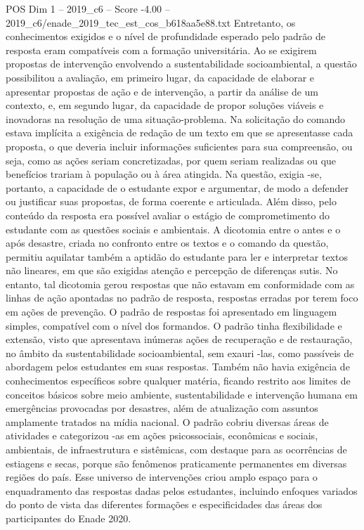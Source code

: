 \begin{textsample}{POS Dim 1 – 2019\_c6 – Score -4.00 – 2019\_c6/enade\_2019\_tec\_est\_cos\_b618aa5e88.txt}
Entretanto, os conhecimentos exigidos e o nível de profundidade esperado pelo padrão de resposta eram compatíveis com a formação universitária.
Ao se exigirem propostas de intervenção envolvendo a sustentabilidade socioambiental, a questão possibilitou a avaliação, em primeiro lugar, da capacidade de elaborar e apresentar propostas de ação e de intervenção, a partir da análise de um contexto, e, em segundo lugar, da capacidade de propor soluções viáveis e inovadoras na resolução de uma situação-problema.
Na solicitação do comando estava implícita a exigência de redação de um texto em que se apresentasse cada proposta, o que deveria incluir informações suficientes para sua compreensão, ou seja, como as ações seriam concretizadas, por quem seriam realizadas ou que benefícios trariam à população ou à área atingida.
Na questão, exigia -se, portanto, a capacidade de o estudante expor e argumentar, de modo a defender ou justificar suas propostas, de forma coerente e articulada.
Além disso, pelo conteúdo da resposta era possível avaliar o estágio de comprometimento do estudante com as questões sociais e ambientais.
A dicotomia entre o antes e o após desastre, criada no confronto entre os textos e o comando da questão, permitiu aquilatar também a aptidão do estudante para ler e interpretar textos não lineares, em que são exigidas atenção e percepção de diferenças sutis.
No entanto, tal dicotomia gerou respostas que não estavam em conformidade com as linhas de ação apontadas no padrão de resposta, respostas erradas por terem foco em ações de prevenção.
O padrão de respostas foi apresentado em linguagem simples, compatível com o nível dos formandos.
O padrão tinha flexibilidade e extensão, visto que apresentava inúmeras ações de recuperação e de restauração, no âmbito da sustentabilidade socioambiental, sem exauri -las, como passíveis de abordagem pelos estudantes em suas respostas.
Também não havia exigência de conhecimentos específicos sobre qualquer matéria, ficando restrito aos limites de conceitos básicos sobre meio ambiente, sustentabilidade e intervenção humana em emergências provocadas por desastres, além de atualização com assuntos amplamente tratados na mídia nacional.
O padrão cobriu diversas áreas de atividades e categorizou -as em ações psicossociais, econômicas e sociais, ambientais, de infraestrutura e sistêmicas, com destaque para as ocorrências de estiagens e secas, porque são fenômenos praticamente permanentes em diversas regiões do país.
Esse universo de intervenções criou amplo espaço para o enquadramento das respostas dadas pelos estudantes, incluindo enfoques variados do ponto de vista das diferentes formações e especificidades das áreas dos participantes do Enade 2020.

\end{textsample}
